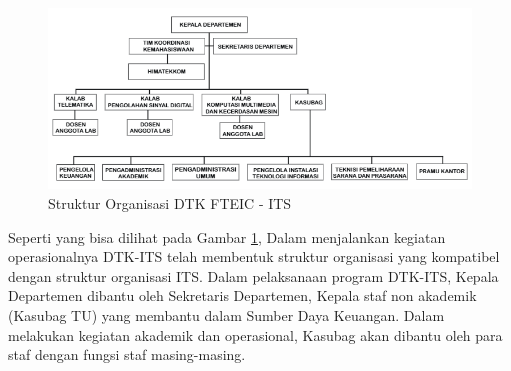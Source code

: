 \begin{figure} [ht] \centering
  \includegraphics[scale=0.4]{gambar/organisasi.png}
  \caption{Struktur Organisasi DTK FTEIC - ITS}
  \label{fig:Organisasi}
\end{figure}

Seperti yang bisa dilihat pada Gambar \ref{fig:Organisasi}, Dalam menjalankan kegiatan operasionalnya DTK-ITS telah membentuk struktur organisasi yang kompatibel dengan struktur organisasi ITS. Dalam pelaksanaan program DTK-ITS, Kepala Departemen dibantu oleh Sekretaris Departemen, Kepala staf non akademik (Kasubag TU) yang membantu dalam Sumber Daya Keuangan. Dalam melakukan kegiatan akademik dan operasional, Kasubag akan dibantu oleh para staf dengan fungsi staf masing-masing.

